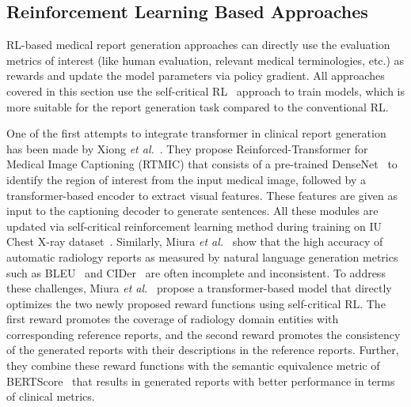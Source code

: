 \documentclass[10pt,journal,compsoc]{IEEEtran}
\begin{document}
\subsection{Reinforcement Learning Based Approaches}

RL-based medical report generation approaches can directly use the evaluation metrics of interest (like human evaluation, relevant medical terminologies, etc.) as rewards and update the model parameters via policy gradient. All approaches covered in this section use the self-critical RL~\cite{rennie2017self} approach to train models, which is more suitable for the report generation task compared to the conventional RL.

One of the first attempts to integrate transformer in clinical report generation has been made by Xiong \textit{et al.}~\cite{xiong2019reinforced}. They propose Reinforced-Transformer for Medical Image Captioning (RTMIC) that consists of a pre-trained DenseNet~\cite{huang2017densely} to identify the region of interest from the input medical image, followed by a transformer-based encoder to extract visual features.
These features are given as input to the captioning decoder to generate sentences. All these modules are updated via self-critical reinforcement learning method during training on IU Chest X-ray dataset~\cite{demner2016preparing}. %
Similarly, Miura \textit{et al.}~\cite{miura2020improving} show that the high accuracy of automatic radiology reports as measured by natural language generation metrics such as BLEU~\cite{papineni2002bleu} and CIDer~\cite{vedantam2015cider} are often incomplete and inconsistent.
To address these challenges,  Miura \textit{et al.}~\cite{miura2020improving} propose a transformer-based model that directly optimizes the two newly proposed reward functions using self-critical RL. The first reward promotes the coverage of radiology domain entities with corresponding reference reports, and the second reward promotes the consistency of the generated reports with their descriptions in the reference reports. Further, they combine these reward functions with the semantic equivalence metric of BERTScore~\cite{zhang2019bertscore} that results in generated reports with better performance in terms of clinical metrics. %
\end{document}
